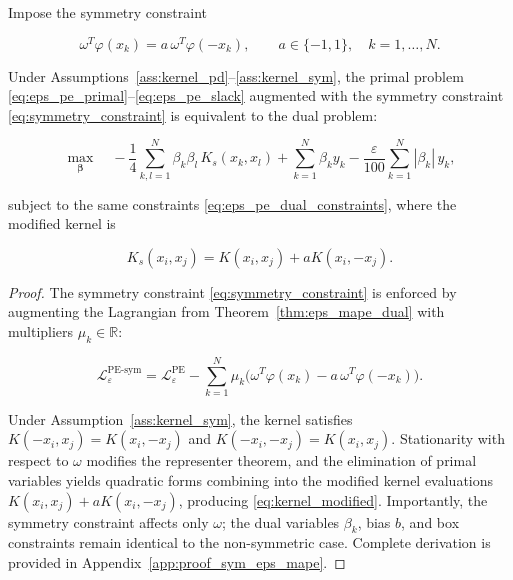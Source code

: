 \documentclass[mathematics,article,submit,pdftex,moreauthors]{Definitions/mdpi}
\begin{document}
Impose the symmetry constraint
\begin{linenomath}
\begin{equation}\label{eq:symmetry_constraint}
\omega^T\varphi(x_k) = a\,\omega^T\varphi(-x_k), \qquad a\in\{-1,1\}, \quad k=1,\ldots,N.
\end{equation}
\end{linenomath}

\begin{Theorem}\label{thm:sym_eps_mape_dual}
Under Assumptions~\ref{ass:kernel_pd}--\ref{ass:kernel_sym}, the primal problem \eqref{eq:eps_pe_primal}--\eqref{eq:eps_pe_slack} 
augmented with the symmetry constraint \eqref{eq:symmetry_constraint} is equivalent to the dual problem:
\begin{linenomath}
\begin{equation}\label{eq:eps_sym_pe_dual}
\max_{\boldsymbol{\beta}}
\quad
-\frac{1}{4}\sum_{k,l=1}^N \beta_k\beta_l\,K_s(x_k,x_l)
+\sum_{k=1}^N \beta_k y_k
-\frac{\varepsilon}{100}\sum_{k=1}^N |\beta_k|\,y_k,
\end{equation}
\end{linenomath}
subject to the same constraints \eqref{eq:eps_pe_dual_constraints}, where the modified kernel is
\begin{linenomath}
\begin{equation}\label{eq:kernel_modified}
K_s(x_i,x_j)=K(x_i,x_j)+aK(x_i,-x_j).
\end{equation}
\end{linenomath}
\end{Theorem}

\begin{proof}
The symmetry constraint \eqref{eq:symmetry_constraint} is enforced by augmenting the Lagrangian from 
Theorem~\ref{thm:eps_mape_dual} with multipliers $\mu_k \in \mathbb{R}$:
\begin{linenomath}
\begin{equation}\label{eq:eps_sym_lagrangian}
\mathcal{L}_{\varepsilon}^{\mathrm{PE\text{-}sym}}
=
\mathcal{L}_{\varepsilon}^{\mathrm{PE}}
-\sum_{k=1}^N \mu_k\bigl(\omega^T\varphi(x_k)-a\,\omega^T\varphi(-x_k)\bigr).
\end{equation}
\end{linenomath}
Under Assumption~\ref{ass:kernel_sym}, the kernel satisfies $K(-x_i,x_j)=K(x_i,-x_j)$ and $K(-x_i,-x_j)=K(x_i,x_j)$.
Stationarity with respect to $\omega$ modifies the representer theorem, and the elimination of primal variables yields 
quadratic forms combining into the modified kernel evaluations $K(x_i,x_j)+aK(x_i,-x_j)$, producing \eqref{eq:kernel_modified}. 
Importantly, the symmetry constraint affects only $\omega$; the dual variables $\beta_k$, bias $b$, and box constraints remain identical to the non-symmetric case.
Complete derivation is provided in Appendix~\ref{app:proof_sym_eps_mape}.
\end{proof}
\end{document}
